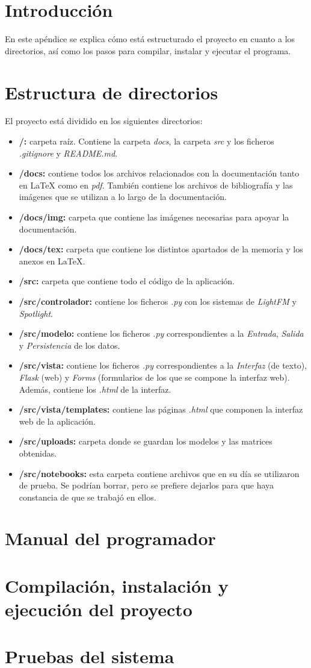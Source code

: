 
\section{Introducción}
En este apéndice se explica cómo está estructurado el proyecto en cuanto a los directorios, así como los pasos para compilar, instalar y ejecutar el programa.

\section{Estructura de directorios}
El proyecto está dividido en los siguientes directorios:
\begin{itemize}
\tightlist
\item \textbf{/:} carpeta raíz. Contiene la carpeta \textit{docs}, la carpeta \textit{src} y los ficheros \textit{.gitignore} y \textit{README.md}.
\item \textbf{/docs:} contiene todos los archivos relacionados con la documentación tanto en \LaTeX{} como en \textit{pdf}. También contiene los archivos de bibliografía y las imágenes que se utilizan a lo largo de la documentación.
\item \textbf{/docs/img:} carpeta que contiene las imágenes necesarias para apoyar la documentación.
\item \textbf{/docs/tex:} carpeta que contiene los distintos apartados de la memoria y los anexos en \LaTeX{}.
\item \textbf{/src:} carpeta que contiene todo el código de la aplicación.
\item \textbf{/src/controlador:} contiene los ficheros \textit{.py} con los sistemas de \textit{LightFM} y \textit{Spotlight}.
\item \textbf{/src/modelo:} contiene los ficheros \textit{.py} correspondientes a la \textit{Entrada}, \textit{Salida} y \textit{Persistencia} de los datos.
\item \textbf{/src/vista:} contiene los ficheros \textit{.py} correspondientes a la \textit{Interfaz} (de texto), \textit{Flask} (web) y \textit{Forms} (formularios de los que se compone la interfaz web). Además, contiene los \textit{.html} de la interfaz.
\item \textbf{/src/vista/templates:} contiene las páginas \textit{.html} que componen la interfaz web de la aplicación.
\item \textbf{/src/uploads:} carpeta donde se guardan los modelos y las matrices obtenidas.
\item \textbf{/src/notebooks:} esta carpeta contiene archivos que en su día se utilizaron de prueba. Se podrían borrar, pero se prefiere dejarlos para que haya constancia de que se trabajó en ellos.
\end{itemize}

\section{Manual del programador}

\section{Compilación, instalación y ejecución del proyecto}

\section{Pruebas del sistema}
